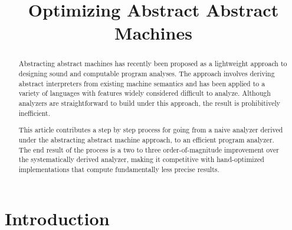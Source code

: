 \documentclass[preprint,onecolumn,9pt]{sigplanconf} %
\begin{document}
\copyrightdata{[to be supplied]}


\title{Optimizing Abstract Abstract Machines}

\authorinfo{}{}{}

\maketitle

\begin{abstract}
Abstracting abstract machines has recently been proposed as a
lightweight approach to designing sound and computable program
analyses.  The approach involves deriving abstract interpreters from
existing machine semantics and has been applied to a variety of
languages with features widely considered difficult to analyze.
Although analyzers are straightforward to build under this approach,
the result is prohibitively inefficient.

This article contributes a step by step process for going from a naive
analyzer derived under the abstracting abstract machine approach, to
an efficient program analyzer.  The end result of the process is a two
to three order-of-magnitude improvement over the systematically
derived analyzer, making it competitive with hand-optimized
implementations that compute fundamentally less precise results.
\end{abstract}




\section{Introduction}
\end{document}
